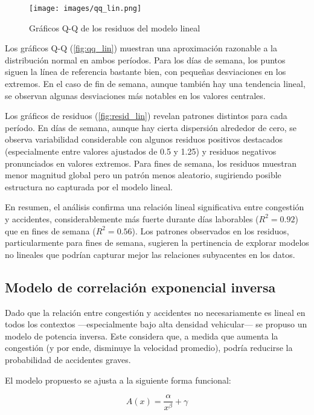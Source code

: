 \documentclass[12pt]{article}
\begin{document}
\begin{figure}[H]
\centering
\texttt{[image: images/qq\_lin.png]}
\caption{Gráficos Q-Q de los residuos del modelo lineal}
\label{fig:qq_lin}
\end{figure}

Los gráficos Q-Q (\autoref{fig:qq_lin}) muestran una aproximación razonable a la distribución normal en ambos períodos. Para los días de semana, los puntos siguen la línea de referencia bastante bien, con pequeñas desviaciones en los extremos. En el caso de fin de semana, aunque también hay una tendencia lineal, se observan algunas desviaciones más notables en los valores centrales.

Los gráficos de residuos (\autoref{fig:resid_lin}) revelan patrones distintos para cada período. En días de semana, aunque hay cierta dispersión alrededor de cero, se observa variabilidad considerable con algunos residuos positivos destacados (especialmente entre valores ajustados de 0.5 y 1.25) y residuos negativos pronunciados en valores extremos. Para fines de semana, los residuos muestran menor magnitud global pero un patrón menos aleatorio, sugiriendo posible estructura no capturada por el modelo lineal.

En resumen, el análisis confirma una relación lineal significativa entre congestión y accidentes, considerablemente más fuerte durante días laborables ($R^2 = 0.92$) que en fines de semana ($R^2 = 0.56$). Los patrones observados en los residuos, particularmente para fines de semana, sugieren la pertinencia de explorar modelos no lineales que podrían capturar mejor las relaciones subyacentes en los datos.


\subsection{Modelo de correlación exponencial inversa}

Dado que la relación entre congestión y accidentes no necesariamente es lineal en todos los contextos —especialmente bajo alta densidad vehicular— se propuso un modelo de potencia inversa. Este considera que, a medida que aumenta la congestión (y por ende, disminuye la velocidad promedio), podría reducirse la probabilidad de accidentes graves.

El modelo propuesto se ajusta a la siguiente forma funcional:

\begin{equation}
A(x) = \frac{\alpha}{x^{\beta}} + \gamma
\end{equation}
\end{document}

